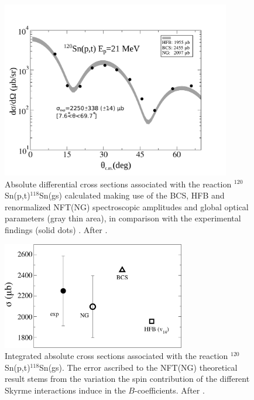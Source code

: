   \begin{figure}
  \centerline{\includegraphics*[width=10cm,angle=0]{C8/figsC8/Fig2_v2}}
  	\caption{Absolute differential  cross sections associated with the reaction
  	$^{120}$Sn(p,t)$^{118}$Sn(gs) calculated making use of the BCS, HFB and renormalized NFT(NG) spectroscopic 
  	amplitudes and global optical parameters (gray thin area), in comparison with the experimental findings (solid dots) \cite{Guazzoni:08}.  
After \cite{Potel:17}.  }\label{fig6.4.2}
  \end{figure}
  \begin{figure}
  \centerline{\includegraphics*[width=8cm,angle=0]{C8/figsC8/fig5_v2}}
  	\caption{Integrated absolute  cross sections associated with the reaction
  	$^{120}$Sn(p,t)$^{118}$Sn(gs). The error ascribed  to
  	the NFT(NG) theoretical result stems from the variation the spin contribution of the different Skyrme interactions induce in the $B$-coefficients.  After \cite{Potel:17}.}\label{fig6.4.3}
  \end{figure}
  



